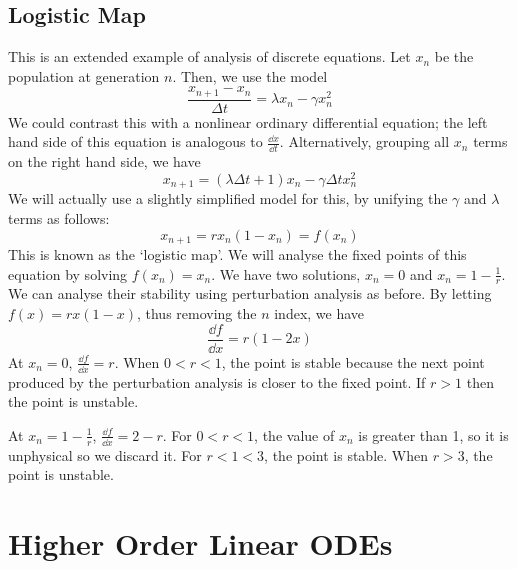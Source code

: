 \documentclass{article}
\begin{document}
	\subsection{Logistic Map}
	This is an extended example of analysis of discrete equations. Let $x_n$ be the population at generation $n$. Then, we use the model
	\[ \frac{x_{n+1} - x_n}{\Delta t} = \lambda x_n - \gamma x_n^2 \]
	We could contrast this with a nonlinear ordinary differential equation; the left hand side of this equation is analogous to $\frac{\dd x}{\dd t}$. Alternatively, grouping all $x_n$ terms on the right hand side, we have
	\[ x_{n+1} = (\lambda \Delta t + 1)x_n - \gamma \Delta t x_n^2 \]
	We will actually use a slightly simplified model for this, by unifying the $\gamma$ and $\lambda$ terms as follows:
	\[ x_{n+1} = r x_n (1 - x_n) = f(x_n) \]
	This is known as the `logistic map'. We will analyse the fixed points of this equation by solving $f(x_n) = x_n$. We have two solutions, $x_n = 0$ and $x_n = 1 - \frac{1}{r}$. We can analyse their stability using perturbation analysis as before. By letting $f(x) = rx(1-x)$, thus removing the $n$ index, we have
	\[ \frac{\dd f}{\dd x} = r(1-2x) \]
	At $x_n = 0$, $\frac{\dd f}{\dd x} = r$. When $0 < r < 1$, the point is stable because the next point produced by the perturbation analysis is closer to the fixed point. If $r > 1$ then the point is unstable.
	
	At $x_n = 1 - \frac{1}{r}$, $\frac{\dd f}{\dd x} = 2 - r$. For $0 < r < 1$, the value of $x_n$ is greater than 1, so it is unphysical so we discard it. For $r < 1 < 3$, the point is stable. When $r > 3$, the point is unstable.

	\section{Higher Order Linear ODEs}
\end{document}
